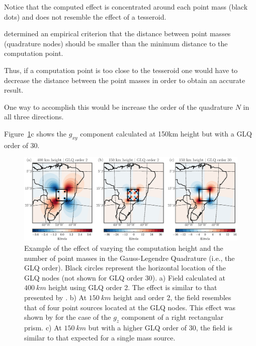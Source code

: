 \documentclass[paper,twocolumn]{geophysics}
\begin{document}
Notice that the computed effect is concentrated around each point mass (black
dots) and does not resemble the effect of a tesseroid.

\citet{Ku1977} determined an empirical criterion that the distance between
point masses (quadrature nodes) should be smaller than the minimum distance to
the computation point.

Thus, if a computation point is too close to the tesseroid one would have to
decrease the distance between the point masses in order to obtain an accurate
result.

One way to accomplish this would be increase the order of the quadrature
$N$ in all three directions.

Figure~\ref{fig:glqerrorsample}c shows the $g_{xy}$ component calculated at
150km height but with a GLQ order of 30.

\begin{figure}
    \centering
    \includegraphics[width=\textwidth]{figs/vary-height-and-order}
    \caption{
        Example of the effect of varying
        the computation height
        and the number of point masses in the Gauss-Legendre Quadrature
        (i.e., the GLQ order).
        Black circles represent the horizontal location of the GLQ nodes
        (not shown for GLQ order 30).
        a) Field calculated at $400\ km$ height using GLQ order 2.
        The effect is similar to that presented by \citet{Asgharzadeh2007}.
        b) At $150\ km$ height and order 2,
        the field resembles that of
        four point sources located at the GLQ nodes.
        This effect was shown by \citet{Ku1977}
        for the case of the $g_z$ component of a right rectangular prism.
        c) At $150\ km$ but with a higher GLQ order of 30,
        the field is similar to that expected for a single mass source.
    }
    \label{fig:glqerrorsample}
\end{figure}
\end{document}
